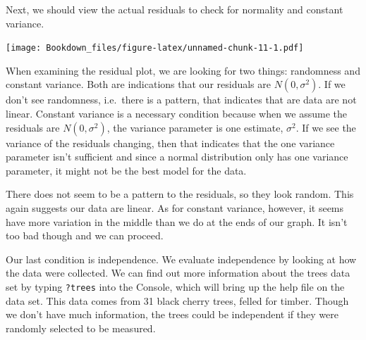 \documentclass[
]{book}
\newenvironment{Shaded}{\begin{snugshade}}{\end{snugshade}}
\newcommand{\DataTypeTok}[1]{\textcolor[rgb]{0.13,0.29,0.53}{#1}}
\newcommand{\DecValTok}[1]{\textcolor[rgb]{0.00,0.00,0.81}{#1}}
\newcommand{\KeywordTok}[1]{\textcolor[rgb]{0.13,0.29,0.53}{\textbf{#1}}}
\newcommand{\NormalTok}[1]{#1}
\newcommand{\OperatorTok}[1]{\textcolor[rgb]{0.81,0.36,0.00}{\textbf{#1}}}
\newcommand{\StringTok}[1]{\textcolor[rgb]{0.31,0.60,0.02}{#1}}
\begin{document}
Next, we should view the actual residuals to check for normality and constant variance.

\begin{Shaded}
\end{Shaded}

\texttt{[image: Bookdown\_files/figure-latex/unnamed-chunk-11-1.pdf]}

When examining the residual plot, we are looking for two things: randomness and constant variance. Both are indications that our residuals are \(N(0,\sigma^2)\). If we don't see randomness, i.e.~there is a pattern, that indicates that are data are not linear. Constant variance is a necessary condition because when we assume the residuals are \(N(0,\sigma^2)\), the variance parameter is one estimate, \(\sigma^2\). If we see the variance of the residuals changing, then that indicates that the one variance parameter isn't sufficient and since a normal distribution only has one variance parameter, it might not be the best model for the data.

There does not seem to be a pattern to the residuals, so they look random. This again suggests our data are linear. As for constant variance, however, it seems have more variation in the middle than we do at the ends of our graph. It isn't too bad though and we can proceed.

Our last condition is independence. We evaluate independence by looking at how the data were collected. We can find out more information about the trees data set by typing \texttt{?trees} into the Console, which will bring up the help file on the data set. This data comes from 31 black cherry trees, felled for timber. Though we don't have much information, the trees could be independent if they were randomly selected to be measured.
\end{document}
